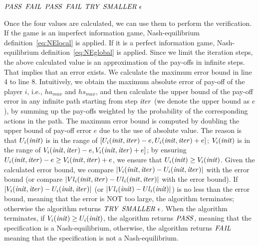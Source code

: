 \begin{algorithm}[H]
\begin{algorithmic}[1]
		
		\ENDFOR
		\RETURN $\mathit{PASS}$
		\RETURN $\mathit{FAIL}$
		\ENDIF
		\ENDIF
		\RETURN $\mathit{PASS}$
		\RETURN $\mathit{FAIL}$
		\ENDIF
		\ENDIF
		\RETURN $\mathit{TRY}\ \mathit{SMALLER}\ \epsilon$
	\end{algorithmic}
\end{algorithm}
Once the four values are calculated, we can use them to perform the verification. 
If the game is an imperfect information game, Nash-equilibrium definition~\ref{eq:NElocal} is applied. If it is a perfect information game, Nash-equilibrium definition~\ref{eq:NEglobal} is applied. 
Since we limit the iteration steps, the above calculated value is an approximation of the pay-offs in infinite steps. That implies that an error exists. We calculate the maximum error bound in line 4 to line 8. Intuitively, we obtain the maximum absolute error of pay-off of the player $i$, i.e., $ha_{max}$ and $hs_{max}$, and then calculate the upper bound of the pay-off error in any infinite path starting from step $\mathit{iter}$ (we denote the upper bound as $e$), by summing up the pay-offs weighted by the probability of the corresponding actions in the path. The maximum error bound is computed by doubling the upper
bound of pay-off error $e$ due to the use of absolute value. The reason is that $U_i(\mathit{init})$ is in the range of $[U_i(\mathit{init}, \mathit{iter})-e, U_i(\mathit{init}, \mathit{iter})+e]$; $V_i(\mathit{init})$ is in the range of $V_i(\mathit{init}, \mathit{iter})-e, V_i(\mathit{init}, \mathit{iter})+e]$; by ensuring $U_i(\mathit{init}, \mathit{iter})-e \ge V_i(\mathit{init}, \mathit{iter})+e$, we ensure that $U_i(\mathit{init})\ge V_i(\mathit{init})$.
Given the calculated error bound, we compare $|V_i(\mathit{init}, \mathit{iter})-U_i(\mathit{init}, \mathit{iter})|$ with the error bound (or compare $|Vl_i(\mathit{init}, \mathit{iter})-Ul_i(\mathit{init}, \mathit{iter})|$ with the error bound). If $|V_i(\mathit{init}, \mathit{iter})-U_i(\mathit{init}, \mathit{iter})|$ (or $|Vl_i(\mathit{init})-Ul_i(\mathit{init})|$) is no less than the error bound, meaning that the error is NOT too large, the algorithm terminates; otherwise the algorithm returns $\mathit{TRY}\ \mathit{SMALLER}\ \epsilon$. When the algorithm terminates, if $V_i(\mathit{init})\ge U_i(\mathit{init})$, the algorithm returns $\mathit{PASS}$, meaning that the specification is a Nash-equilibrium, otherwise, the algorithm returns $\mathit{FAIL}$ meaning that the specification is not a Nash-equilibrium.
